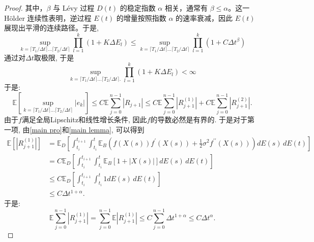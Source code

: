 \begin{proof}
	其中，\( \beta \) 与 Lévy 过程 \( D(t) \) 的稳定指数 \( \alpha \) 相关，通常有 \( \beta \leq \alpha \)。这一 Hölder 连续性表明，逆过程 \( E(t) \) 的增量按照指数 \( \alpha \) 的速率衰减，因此 \( E(t) \) 展现出平滑的连续路径。于是, 
	\begin{equation*}
		\sup\limits_{k=\lceil T_1/\Delta t \rceil \ldots \lceil T_2/\Delta t \rceil} \prod\limits_{l=1}^{k}(1+K\Delta E_l) \leq \sup\limits_{k=\lceil T_1/\Delta t \rceil \ldots \lceil T_2/\Delta t \rceil} \prod\limits_{l=1}^{k}(1+C\Delta t^{\beta})
	\end{equation*}
	通过对$\Delta t$取极限, 
	于是
	\begin{equation*}
		\sup\limits_{k=\lceil T_1/\Delta t \rceil \ldots \lceil T_2/\Delta t \rceil. } \prod\limits_{l=1}^{k}(1+K\Delta E_l) < \infty
	\end{equation*}
	于是:
	\begin{equation}
		\mathbb{E}\left[\sup\limits_{k=\lceil T_1/\Delta t \rceil \ldots \lceil T_2/\Delta t \rceil}\left|e_k\right|\right] \leq C\mathbb{E}\sum_{j=0}^{n-1}|R_{j+1}| \leq C\mathbb{E}\sum\limits_{j=0}^{n-1}|R_{j+1}^{(1)}| + C\mathbb{E}\sum\limits_{j=0}^{n-1}|R_{j+1}^{(2)}|. 
	\end{equation}
	由于$f$满足全局Lipschitz和线性增长条件, 因此$f$的导数必然是有界的. 
	于是对于第一项,  由\cref{main pro}和\cref{main lemma}, 可以得到
	\begin{align*}
		\mathbb{E} \left[|R_{j+1}^{(1)}| \right] &= \mathbb{E}_D \left[
		\int_{t_i}^{t_{i+1}} \int_{t_i}^{t}  \mathbb{E}_B \left( f(X(s)) f^{\prime}(X(s)) + \frac{1}{2} \sigma^2 f^{\prime\prime}(X(s)) \right) dE(s) \, dE(t)
		\right] \\
		&= C\mathbb{E}_D \left[
		\int_{t_i}^{t_{i+1}} \int_{t_i}^{t}  \mathbb{E}_B \left[1+|X(s)| \right] dE(s) \, dE(t)
		\right] \\
		& \le C\mathbb{E}_D \left[
		\int_{t_i}^{t_{i+1}} \int_{t_i}^{t}  1 dE(s) \, dE(t)
		\right] \\
		&\le C\Delta t^{1+\alpha}. 
	\end{align*}
	于是:
	\begin{equation}
		\mathbb{E}\sum\limits_{j=0}^{n-1}|R_{j+1}^{(1)}|= \sum\limits_{j=0}^{n-1}\mathbb{E}|R_{j+1}^{(1)}| \leq
		C\sum\limits_{j=0}^{n-1}\Delta t^{1+\alpha} \le C\Delta t^\alpha. 
	\end{equation}
	

\end{proof}
